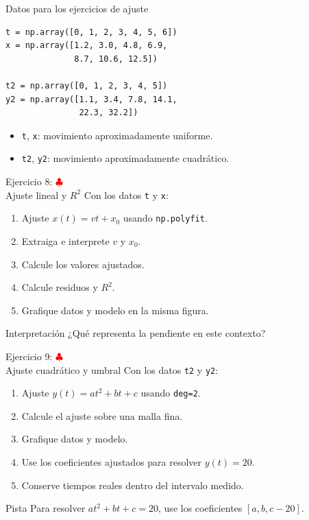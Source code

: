 \documentclass[10pt]{beamer}
\begin{document}
\begin{frame}[fragile]{Datos para los ejercicios de ajuste}
\begin{verbatim}
t = np.array([0, 1, 2, 3, 4, 5, 6])
x = np.array([1.2, 3.0, 4.8, 6.9,
              8.7, 10.6, 12.5])

t2 = np.array([0, 1, 2, 3, 4, 5])
y2 = np.array([1.1, 3.4, 7.8, 14.1,
               22.3, 32.2])
\end{verbatim}

  \begin{itemize}
    \item \texttt{t}, \texttt{x}: movimiento aproximadamente uniforme.
    \item \texttt{t2}, \texttt{y2}: movimiento aproximadamente cuadrático.
  \end{itemize}
\end{frame}

\begin{frame}{Ejercicio 8: \hfill \textcolor{red}{$\clubsuit$} \\ Ajuste lineal y \(R^2\)}
  Con los datos \texttt{t} y \texttt{x}:

  \begin{enumerate}
    \item Ajuste \(x(t)=vt+x_0\) usando \texttt{np.polyfit}.
    \item Extraiga e interprete \(v\) y \(x_0\).
    \item Calcule los valores ajustados.
    \item Calcule residuos y \(R^2\).
    \item Grafique datos y modelo en la misma figura.
  \end{enumerate}

  \begin{block}{Interpretación}
    ¿Qué representa la pendiente en este contexto?
  \end{block}
\end{frame}

\begin{frame}{Ejercicio 9: \hfill \textcolor{red}{$\clubsuit$} \\ Ajuste cuadrático y umbral}
  Con los datos \texttt{t2} y \texttt{y2}:

  \begin{enumerate}
    \item Ajuste \(y(t)=at^2+bt+c\) usando \texttt{deg=2}.
    \item Calcule el ajuste sobre una malla fina.
    \item Grafique datos y modelo.
    \item Use los coeficientes ajustados para resolver \(y(t)=20\).
    \item Conserve tiempos reales dentro del intervalo medido.
  \end{enumerate}

  \begin{alertblock}{Pista}
    Para resolver \(at^2+bt+c=20\), use los coeficientes \([a,b,c-20]\).
  \end{alertblock}
\end{frame}
\end{document}
